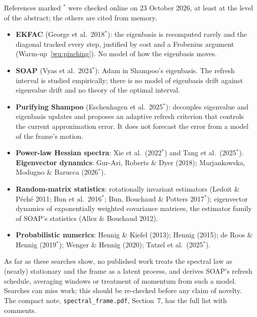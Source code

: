 \documentclass[11pt,a4paper]{article}
\theoremstyle{plain}
\theoremstyle{definition}
\theoremstyle{remark}
\begin{document}
References marked $^*$ were checked online on 23 October 2026, at least at the level of the abstract; the others are
cited from memory.
\begin{itemize}[itemsep=1pt]
\item \textbf{EKFAC} (George et al.\ 2018$^*$): the eigenbasis is recomputed rarely and the diagonal tracked every
  step, justified by cost and a Frobenius argument (Warm-up~\ref{wu:pinching}). No model of how the eigenbasis moves.
\item \textbf{SOAP} (Vyas et al.\ 2024$^*$): Adam in Shampoo's eigenbasis. The refresh interval is studied
  empirically; there is no model of eigenbasis drift against eigenvalue drift and no theory of the optimal interval.
\item \textbf{Purifying Shampoo} (Eschenhagen et al.\ 2025$^*$): decouples eigenvalue and eigenbasis updates and
  proposes an adaptive refresh criterion that controls the current approximation error. It does not forecast the
  error from a model of the frame's motion.
\item \textbf{Power-law Hessian spectra}: Xie et al.\ (2022$^*$) and Tang et al.\ (2025$^*$). \textbf{Eigenvector
  dynamics}: Gur-Ari, Roberts \& Dyer (2018); Marjankowska, Modugno \& Barucca (2026$^*$).
\item \textbf{Random-matrix statistics}: rotationally invariant estimators (Ledoit \& P\'ech\'e 2011; Bun et al.\
  2016$^*$; Bun, Bouchaud \& Potters 2017$^*$); eigenvector dynamics of exponentially weighted covariance matrices,
  the estimator family of SOAP's statistics (Allez \& Bouchaud 2012).
\item \textbf{Probabilistic numerics}: Hennig \& Kiefel (2013); Hennig (2015); de Roos \& Hennig (2019$^*$); Wenger \&
  Hennig (2020); Tatzel et al.\ (2025$^*$).
\end{itemize}
As far as these searches show, no published work treats the spectral law as (nearly) stationary and the frame as a
latent process, and derives SOAP's refresh schedule, averaging windows or treatment of momentum from such a model.
Searches can miss work; this should be re-checked before any claim of novelty. The compact note,
\texttt{spectral\_frame.pdf}, Section~7, has the full list with comments.
\end{document}
